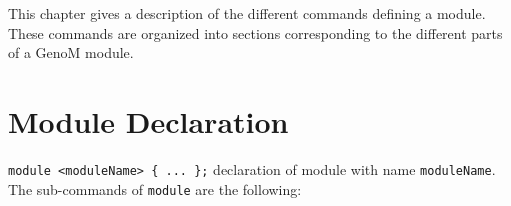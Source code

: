 %
%
%
%
%
%

This chapter gives a description of the different commands defining
a {\GenoM} module. These commands are organized into sections
corresponding to the different parts of a GenoM module.

\section{Module Declaration}
\label{sec|declaration}

\noindent
{\tt module <moduleName> \{ ... \};} declaration of module with name
{\tt moduleName}. \\

\noindent
The sub-commands of {\tt module} are the following:

